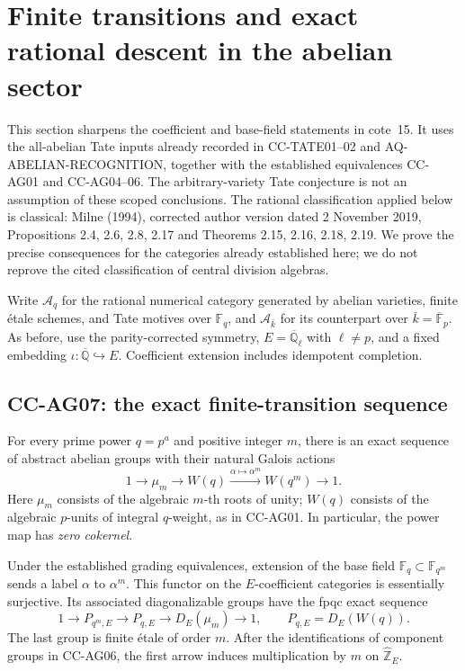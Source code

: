 \section{Finite transitions and exact rational descent in the abelian sector}

This section sharpens the coefficient and base-field statements in
cote~15.  It uses the all-abelian Tate inputs already recorded in
CC-TATE01--02 and AQ-ABELIAN-RECOGNITION, together with the established
equivalences CC-AG01 and CC-AG04--06.  The arbitrary-variety Tate
conjecture is not an assumption of these scoped conclusions.  The
rational classification applied below is classical: Milne (1994),
corrected author version dated 2 November 2019, Propositions 2.4,
2.6, 2.8, 2.17 and Theorems 2.15, 2.16, 2.18, 2.19.
We prove the precise
consequences for the categories already established here; we do not
reprove the cited classification of central division algebras.

Write \(\mathcal A_q\) for the rational numerical category generated
by abelian varieties, finite \'{e}tale schemes, and Tate motives over
\(\mathbb F_q\), and \(\mathcal A_{\bar k}\) for its counterpart over
\(\bar k=\overline{\mathbb F}_p\).  As before, use the
parity-corrected symmetry, \(E=\overline{\mathbb Q}_\ell\) with
\(\ell\ne p\), and a fixed embedding
\(\iota:\overline{\mathbb Q}\hookrightarrow E\).
Coefficient extension includes idempotent completion.

\subsection{CC-AG07: the exact finite-transition sequence}

For every prime power \(q=p^a\) and positive integer \(m\), there is
an exact sequence of abstract abelian groups with their natural
Galois actions
\[
  1\longrightarrow\mu_m\longrightarrow W(q)
   \xrightarrow{\alpha\mapsto\alpha^m}W(q^m)
   \longrightarrow1.                                      \tag{CC-AG.21}
\]
Here \(\mu_m\) consists of the algebraic \(m\)-th roots of unity;
\(W(q)\) consists of the algebraic \(p\)-units of integral
\(q\)-weight, as in CC-AG01.  In particular, the power map has
\emph{zero cokernel}.

Under the established grading equivalences, extension of the
base field \(\mathbb F_q\subset\mathbb F_{q^m}\) sends a label
\(\alpha\) to \(\alpha^m\).  This functor on the
\(E\)-coefficient categories is essentially surjective.  Its
associated diagonalizable groups have the fpqc exact sequence
\[
  1\longrightarrow P_{q^m,E}\longrightarrow P_{q,E}
   \longrightarrow D_E(\mu_m)\longrightarrow1,
 \qquad P_{q,E}=D_E(W(q)).                                \tag{CC-AG.22}
\]
The last group is finite \'{e}tale of order \(m\).  After the
identifications of component groups in CC-AG06, the first arrow
induces multiplication by \(m\) on
\(\widehat{\mathbb Z}_E\).

